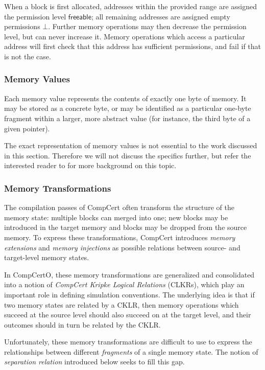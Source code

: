 \documentclass[acmsmall,screen,review,anonymous]{acmart}
\newcommand{\kw}[1]{\ensuremath{ \mathsf{#1} }}
\begin{document}
When a block is first allocated,
addresses within the provided range
are assigned the permission level $\kw{freeable}$;
all remaining addresses are assigned
empty permissions $\bot$.
Further memory operations may then decrease the permission level,
but can never increase it.
Memory operations which access a particular address
will first check that this address has sufficient permissions,
and fail if that is not the case.

\subsubsection{Memory Values}

Each memory value represents the contents of exactly one byte of memory.
It may be stored as a concrete byte,
or may be identified as a particular one-byte fragment
within a larger, more abstract value
(for instance, the third byte of a given pointer).

The exact representation of memory values
is not essential to the work discussed in this section.
Therefore
we will not discuss the specifics further,
but refer the interested reader to \citet{compcertmmv2}
for more background on this topic.

\subsubsection{Memory Transformations}

The compilation passes of CompCert
often transform the structure of the memory state:
multiple blocks can merged into one;
new blocks may be introduced in the target memory
and blocks may be dropped from the source memory.
To express these transformations,
CompCert introduces \emph{memory extensions} and \emph{memory injections}
as possible relations between source- and target-level memory states.

In CompCertO,
these memory transformations are generalized and consolidated
into a notion of \emph{CompCert Kripke Logical Relations} (CLKRs),
which play an important role in defining simulation conventions.
The underlying idea is that
if two memory states are related by a CKLR,
then memory operations which succeed at the source level
should also succeed on at the target level,
and their outcomes should in turn be related
by the CKLR.

Unfortunately,
these memory transformations are difficult to use
to express the relationships between
different \emph{fragments} of a single memory state.
The notion of \emph{separation relation} introduced below
seeks to fill this gap.
\end{document}
